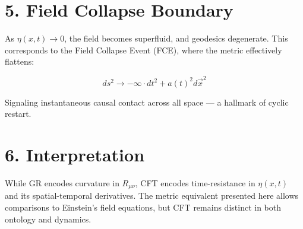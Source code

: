 \documentclass{article}
\begin{document}
\section*{5. Field Collapse Boundary}
As $\eta(x,t) \to 0$, the field becomes superfluid, and geodesics degenerate. This corresponds to the Field Collapse Event (FCE), where the metric effectively flattens:

\[
ds^2 \to -\infty \cdot dt^2 + a(t)^2 d\vec{x}^2
\]

Signaling instantaneous causal contact across all space — a hallmark of cyclic restart.

\section*{6. Interpretation}
While GR encodes curvature in $R_{\mu\nu}$, CFT encodes time-resistance in $\eta(x,t)$ and its spatial-temporal derivatives. The metric equivalent presented here allows comparisons to Einstein’s field equations, but CFT remains distinct in both ontology and dynamics.
\end{document}
